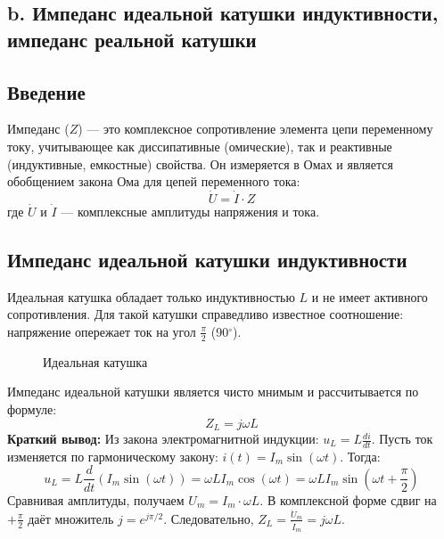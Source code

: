 \documentclass[a4paper]{article}
\begin{document}
\subsection{b.	Импеданс идеальной катушки индуктивности, импеданс реальной катушки}

\subsection*{Введение}
Импеданс ($Z$) — это комплексное сопротивление элемента цепи переменному току, учитывающее как диссипативные (омические), так и реактивные (индуктивные, емкостные) свойства. Он измеряется в Омах и является обобщением закона Ома для цепей переменного тока:
\[
\dot{U} = \dot{I} \cdot Z
\]
где $\dot{U}$ и $\dot{I}$ — комплексные амплитуды напряжения и тока.

\subsection*{Импеданс идеальной катушки индуктивности}
Идеальная катушка обладает только индуктивностью $L$ и не имеет активного сопротивления. Для такой катушки справедливо известное соотношение: напряжение опережает ток на угол $\frac{\pi}{2}$ (90$^\circ$).

\begin{figure}
    \centering
    \caption{Идеальная катушка}
\end{figure}

Импеданс идеальной катушки является чисто мнимым и рассчитывается по формуле:
\[
Z_L = j \omega L
\]
\textbf{Краткий вывод:}
Из закона электромагнитной индукции: $u_L = L \frac{di}{dt}$.
Пусть ток изменяется по гармоническому закону: $i(t) = I_m \sin(\omega t)$.
Тогда:
\[
u_L = L \frac{d}{dt}(I_m \sin(\omega t)) = \omega L I_m \cos(\omega t) = \omega L I_m \sin(\omega t + \frac{\pi}{2})
\]
Сравнивая амплитуды, получаем $U_m = I_m \cdot \omega L$. В комплексной форме сдвиг на $+\frac{\pi}{2}$ даёт множитель $j = e^{j\pi/2}$. Следовательно, $Z_L = \frac{\dot{U}_m}{\dot{I}_m} = j\omega L$.
\end{document}
